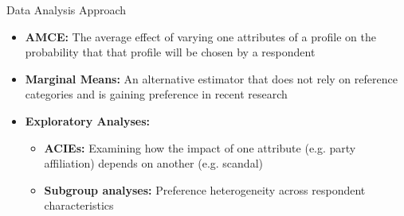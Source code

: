 \documentclass[9pt, aspectratio=169]{beamer}
\newcommand{\customcite}[1]{\textcolor{blue}{\parencite{#1}}}
\begin{document}

 


\begin{frame}{Data Analysis Approach}
    \begin{itemize}
\item \textbf{AMCE:} The average effect of varying one attributes of a profile on the probability that that profile will be chosen by a respondent \customcite{BansakEtAl2022}\vspace{0.3cm} 
\item \textbf{Marginal Means:} An alternative estimator that does not rely on reference categories and is gaining preference in recent research \customcite{Casiraghi} \vspace{0.3cm} 
        \item \textbf{Exploratory Analyses:}  
        \begin{itemize}
            \item \textbf{ACIEs:} Examining how the impact of one attribute (e.g. party affiliation) depends on another (e.g. scandal) \vspace{0.2cm}  
            \item \textbf{Subgroup analyses:} Preference heterogeneity across respondent characteristics \customcite{Leeper_Hobolt_Tilley_2020} \vspace{0.2cm} 
        \end{itemize}
    \end{itemize}
\end{frame}


\end{document}
